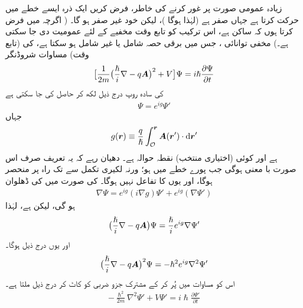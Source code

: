  زیادہ عمومی صورت  پر غور کرنے کی خاطر،  فرض کریں ایک ذرہ  ایسے خطے  میں حرکت کرتا ہے جہاں   صفر ہے (لہٰذا  ہوگا )، لیکن   خود غیر صفر ہو گا۔ ( اگرچہ میں فرض کرتا ہوں کہ  ساکن ہے،  اس ترکیب کو تابع وقت مخفیے  کے لئے عمومیت دی جا سکتی ہے۔) مخفی توانائی ،  جس میں برقی حصہ   شامل یا غیر شامل ہو سکتا ہے،  کی (تابع وقت)   مساوات شروڈنگر 
\begin{align}\label{مساوات_حر_تابع_وقت_مساوات_شروڈنگر_اہارونو}
\big [ \frac{1}{2m} \big ( \frac{\hslash}{i} \nabla - q {{\boldsymbol{A}}} \big )^2 + V \big ] \Psi = i \hslash \frac{\partial \Psi}{\partial t}
\end{align}
کی سادہ روپ درج ذیل لکھ کر حاصل کی جا سکتی ہے 
\begin{align}
\Psi = e^{i g} \Psi'
\end{align}
جہاں  
\begin{align}
g (\kvec{r}) \equiv \frac{q}{\hslash} \int_{\mathcal{O}}^{\kvec{r}} \kvec{A} (\kvec{r}') \cdot \dif \kvec{r}'
\end{align}
ہے اور  کوئی  (اختیاری منتخب)  نقطہ حوالہ ہے۔  دھیان رہے کہ یہ تعریف صرف اس صورت با معنی ہوگی جب پورے  خطے میں  ہو؛  ورنہ لکیری تکمل  سے  تک راہ پر منحصر ہوگا،  اور یوں  کا تفاعل نہیں ہوگا۔   کی صورت میں  کی ڈھلوان  
\begin{align*}
\nabla \Psi = e^{i g} (i \nabla g) \Psi' + e^{ig}(\nabla \Psi')
\end{align*}
ہو گی، لیکن  ہے،  لہٰذا 
\begin{align}\label{مساوات_حر_ہیملٹنی_اہارونو_حاصل_الف}
\big ( \frac{\hslash}{i} \nabla - q {{\boldsymbol{A}}} \big ) \Psi = \frac{\hslash}{i} e^{i g} \nabla \Psi'
\end{align}
اور یوں درج ذیل ہوگا۔
\begin{align}\label{مساوات_حر_ہیملٹنی_اہارونو_حاصل_ب}
\big ( \frac{\hslash}{i} \nabla - q {{\boldsymbol{A}}} \big )^2 \Psi = - \hslash^2 e^{i g} \nabla^2 \Psi'
\end{align}
اس کو مساوات    میں پُر کر کے مشترک جزو ضربی  کو کاٹ کر درج ذیل ملتا ہے۔
\begin{align}\label{مساوات_حر_مساوات_شروڈنگر_بغیر_اے}
- \frac{\hslash^2}{2m} \nabla^2 \Psi' + V \Psi' = i \hslash \frac{\partial \Psi'}{\partial t}
\end{align}
%
